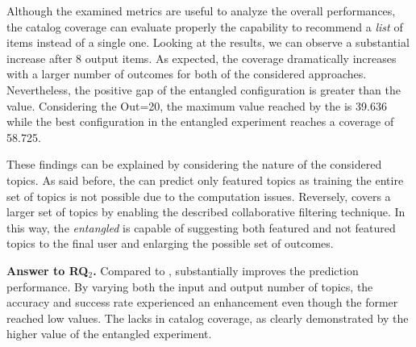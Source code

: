 Although the examined metrics are useful to analyze the overall performances, the catalog coverage can evaluate properly the capability to recommend a \emph{list} of items instead of a single one. Looking at the results, we can observe a substantial increase after 8 output items. As expected, the coverage dramatically increases with a larger number of outcomes for both of the considered approaches. Nevertheless, the positive gap of the entangled configuration is greater than the \MNB value. Considering the Out=20, the maximum value reached by the \MNB is 39.636 while the best configuration in the entangled experiment reaches a coverage of 58.725.

These findings can be explained by considering the nature of the considered topics. As said before, the \MNB can predict only featured topics as training the entire set of \GH topics is not possible due to the computation issues. Reversely, \TF covers a larger set of topics by enabling the described collaborative filtering technique. In this way, the \emph{entangled} is capable of suggesting both featured and not featured topics to the final user and enlarging the possible set of outcomes.



\begin{tcolorbox}[boxrule=0.86pt,left=0.3em, right=0.3em,top=0.1em, bottom=0.05em]
\textbf{Answer to RQ$_2$.} Compared to \MNB, \TFb substantially improves the prediction performance. By varying both the input and output number of topics, the accuracy and success rate experienced an enhancement even though the former reached low values. The \MNB lacks in catalog coverage, as clearly demonstrated by the higher value of the entangled experiment.
\end{tcolorbox}










